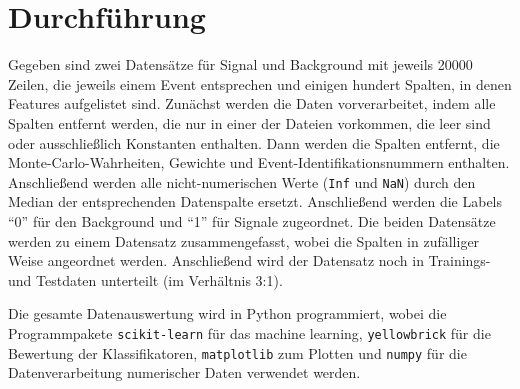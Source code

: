 \section{Durchführung}
\label{sec:Durchführung}

Gegeben sind zwei Datensätze für Signal und Background mit jeweils 20000 Zeilen, die jeweils einem Event entsprechen und einigen hundert Spalten, in denen Features aufgelistet sind. Zunächst werden die Daten vorverarbeitet, indem alle Spalten entfernt werden, die nur in einer der Dateien vorkommen, die leer sind oder ausschließlich Konstanten enthalten. Dann werden die Spalten entfernt, die Monte-Carlo-Wahrheiten, Gewichte und Event-Identifikationsnummern enthalten. Anschließend werden alle nicht-numerischen Werte (\texttt{Inf} und \texttt{NaN}) durch den Median der entsprechenden Datenspalte ersetzt. Anschließend werden die Labels \enquote{0} für den Background und \enquote{1} für Signale zugeordnet. Die beiden Datensätze werden zu einem Datensatz zusammengefasst, wobei die Spalten in zufälliger Weise angeordnet werden. Anschließend wird der Datensatz noch in Trainings- und Testdaten unterteilt (im Verhältnis 3:1).

Die gesamte Datenauswertung wird in Python programmiert, wobei die Programmpakete \texttt{scikit-learn} \cite{scikit} für das machine learning, \texttt{yellowbrick} \cite{yellowbrick} für die Bewertung der Klassifikatoren, \texttt{matplotlib} \cite{matplotlib} zum Plotten und \texttt{numpy} \cite{numpy} für die Datenverarbeitung numerischer Daten verwendet werden.